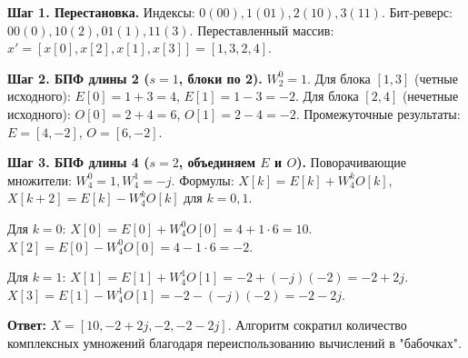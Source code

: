 \documentclass[12pt,a4paper]{article}
\theoremstyle{definition}
\begin{document}
\textbf{Шаг 1. Перестановка.} Индексы: $0(00), 1(01), 2(10), 3(11)$.
Бит-реверс: $00(0), 10(2), 01(1), 11(3)$.
Переставленный массив: $x' = [x[0], x[2], x[1], x[3]] = [1, 3, 2, 4]$.

\textbf{Шаг 2. БПФ длины 2 ($s=1$, блоки по 2).} $W_2^0 = 1$.
Для блока $[1, 3]$ (четные исходного):
$E[0] = 1 + 3 = 4$, $E[1] = 1 - 3 = -2$.
Для блока $[2, 4]$ (нечетные исходного):
$O[0] = 2 + 4 = 6$, $O[1] = 2 - 4 = -2$.
Промежуточные результаты: $E = [4, -2]$, $O = [6, -2]$.

\textbf{Шаг 3. БПФ длины 4 ($s=2$, объединяем $E$ и $O$).} Поворачивающие множители: $W_4^0 = 1, W_4^1 = -j$.
Формулы: $X[k] = E[k] + W_4^k O[k]$, $X[k+2] = E[k] - W_4^k O[k]$ для $k=0, 1$.

Для $k=0$:
$X[0] = E[0] + W_4^0 O[0] = 4 + 1 \cdot 6 = 10$.
$X[2] = E[0] - W_4^0 O[0] = 4 - 1 \cdot 6 = -2$.

Для $k=1$:
$X[1] = E[1] + W_4^1 O[1] = -2 + (-j)(-2) = -2 + 2j$.
$X[3] = E[1] - W_4^1 O[1] = -2 - (-j)(-2) = -2 - 2j$.

\textbf{Ответ:} $X = [10, -2+2j, -2, -2-2j]$.
Алгоритм сократил количество комплексных умножений благодаря переиспользованию вычислений в "бабочках".
\end{document}
